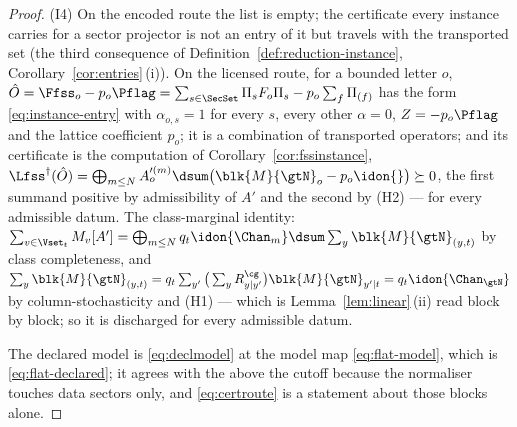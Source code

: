 \begin{proof}
(I4) On the encoded route the list is empty; the certificate every instance
carries for a sector projector is not an entry of it but travels with the
transported set (the third consequence of
Definition~\ref{def:reduction-instance},
Corollary~\ref{cor:entries}\,(i)). On the licensed route, for a
bounded letter $o$, $\hat O=\Ffss_o-p_o\Pflag=\sum_{s\in\SecSet}\Pi_sF_o\Pi_s
-p_o\sum_{f}\Pi_{(f)}$ has the form \eqref{eq:instance-entry} with
$\alpha_{o,s}=1$ for every $s$, every other $\alpha=0$, $Z=-p_o\Pflag$ and
the lattice coefficient $p_o$; it is a combination of transported operators;
and its certificate is the computation of Corollary~\ref{cor:fssinstance},
$\Lfss^{\dagger}(\hat O)=\bigoplus_{m\le N}A'^{(m)}_o\dsum
\big(\blk{M}{\gtN}_o-p_o\idon{}\big)\succeq0$, the first summand positive by
admissibility of $A'$ and the second by (H2) --- for every admissible datum.
The class-marginal identity: $\sum_{v\in\Vset_t}M_v[A']
=\bigoplus_{m\le N}q_t\idon{\Chan_m}\dsum\sum_{y}\blk{M}{\gtN}_{(y,t)}$ by
class completeness, and $\sum_y\blk{M}{\gtN}_{(y,t)}
=q_t\sum_{y'}\big(\sum_yR^{\cg}_{y|y'}\big)\blk{M}{\gtN}_{y'|t}
=q_t\idon{\Chan_{\gtN}}$ by column-stochasticity and (H1) --- which is
Lemma~\ref{lem:linear}\,(ii) read block by block; so it is discharged for
every admissible datum.

The declared model is \eqref{eq:declmodel} at the model map
\eqref{eq:flat-model}, which is \eqref{eq:flat-declared}; it agrees with the
 above the cutoff because the normaliser touches data sectors
only, and \eqref{eq:certroute} is a statement about those blocks alone.
\end{proof}
